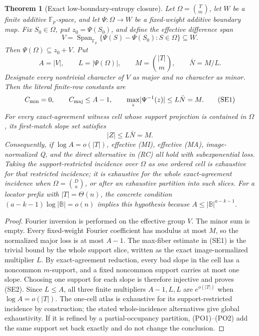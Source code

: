 \documentclass[12pt,a4paper]{amsart}
\numberwithin{equation}{section}
\newtheorem{theorem}{Theorem}[section]
\theoremstyle{remark}
\DeclareMathOperator{\Span}{Span}
\newcommand{\F}{\mathbb F}
\newcommand{\B}{\mathbb B}
\newcommand{\abs}[1]{\lvert #1\rvert}
\begin{document}
\begin{theorem}[Exact low-boundary-entropy closure]
\label{thm:small-effective-dual-closure}
Let \(\Omega=\binom Tm\), let \(W\) be a finite additive
\(\F_p\)-space, and let \(\Psi:\Omega\to W\) be a fixed-weight additive
boundary map.  Fix \(S_0\in\Omega\), put \(z_0=\Psi(S_0)\), and define
the effective difference span
\[
 V=\Span_{\F_p}\{\Psi(S)-\Psi(S_0):S\in\Omega\}\subseteq W.
\]
Then \(\Psi(\Omega)\subseteq z_0+V\).  Put
\[
       A=\abs V,\qquad L=\abs{\Psi(\Omega)},
       \qquad M=\binom{\abs T}m,\qquad \bar N=M/L.
\]
Designate every nontrivial character of \(V\) as major and no character
as minor.  Then the literal finite-row constants are
\[
 C_{\rm min}=0,\qquad C_{\rm maj}\le A-1,\qquad
 \max_z\abs{\Psi^{-1}(z)}\le L\bar N=M.            \tag{SE1}
\]
For every exact-agreement witness cell whose support projection is
contained in \(\Omega\), its first-match slope set satisfies
\[
                         \abs Z\le L\bar N=M.       \tag{SE2}
\]
Consequently, if \(\log A=o(\abs T)\), effective \textup{(MI)},
effective \textup{(MA)}, image-normalized Q, and the direct alternative
in \textup{(RC)} all hold with subexponential loss.  Taking the
support-restricted incidence over \(\Omega\) as one ordered cell is
exhaustive for that restricted incidence; it is exhaustive for the whole
exact-agreement incidence when \(\Omega=\binom Da\), or after an
exhaustive partition into such slices.  For a locator prefix with
\(\abs T=\Theta(n)\), the concrete condition
\((a-k-1)\log\abs\B=o(n)\) implies this hypothesis because
\(A\le\abs\B^{a-k-1}\).
\end{theorem}

\begin{proof}
Fourier inversion is performed on the effective group \(V\).  The minor
sum is empty.  Every fixed-weight Fourier coefficient has
modulus at most \(M\), so the normalized major loss is at most \(A-1\).
The max-fiber estimate in \textup{(SE1)} is the trivial bound by the whole
support slice, written as the exact image-normalized multiplier \(L\).
By exact-agreement reduction, every bad slope in the cell has a noncommon
\(m\)-support, and a fixed noncommon support carries at most one slope.
Choosing one support for each slope is therefore injective and proves
\textup{(SE2)}.  Since \(L\le A\), all three finite multipliers
\(A-1,L,L\) are \(e^{o(\abs T)}\) when \(\log A=o(\abs T)\).
The one-cell atlas is exhaustive for its support-restricted incidence by
construction; the stated whole-incidence alternatives give global
exhaustivity.  If it is refined by a partial-occupancy partition,
\textup{(PO1)}--\textup{(PO2)} add the same support set back exactly and
do not change the conclusion.
\end{proof}
\end{document}
